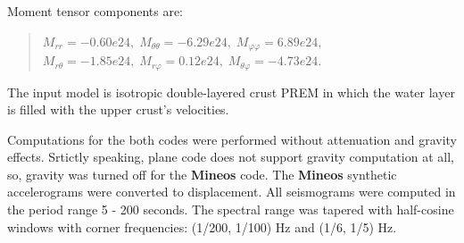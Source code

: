 Moment tensor components are:
\begin{quote}
$M_{rr}=-0.60e24,\;M_{\theta\theta}= -6.29e24,\;M_{\varphi\varphi}=6.89e24,$ \\
$M_{r\theta}= -1.85e24,\;M_{r\varphi}=0.12e24,\;M_{\theta\varphi}=-4.73e24$.
\end{quote}
The input model is isotropic double-layered crust PREM in which the water layer 
is filled with the upper crust's velocities.

\noindent Computations for the both codes were performed without attenuation
 and gravity effects. Srtictly speaking, plane code does not support
gravity computation at all, so, gravity was turned off for the {\bf Mineos} code.
The {\bf Mineos} synthetic accelerograms were converted to displacement.
All seismograms were computed in the period range 5 - 200 seconds.
The spectral range was tapered with half-cosine windows with corner
frequencies: (1/200, 1/100) Hz and (1/6, 1/5) Hz.

